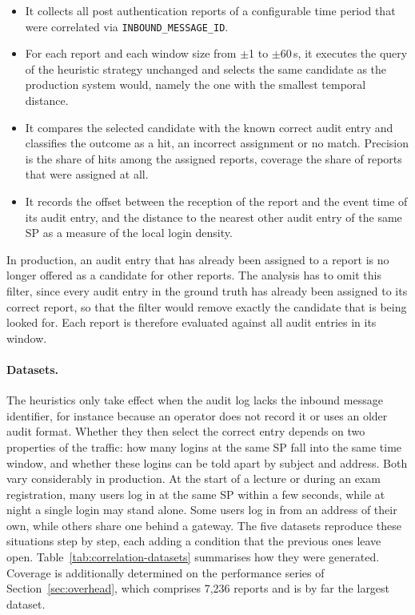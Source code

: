 \documentclass[../main.tex]{subfiles}
\begin{document}
\begin{itemize}
    \item It collects all post authentication reports of a configurable time period that were correlated via \texttt{INBOUND\_\allowbreak{}MESSAGE\_\allowbreak{}ID}.
    \item For each report and each window size from $\pm$1 to $\pm$60\,s, it executes the query of the heuristic strategy unchanged and selects the same candidate as the production system would, namely the one with the smallest temporal distance.
    \item It compares the selected candidate with the known correct audit entry and classifies the outcome as a hit, an incorrect assignment or no match. Precision is the share of hits among the assigned reports, coverage the share of reports that were assigned at all.
    \item It records the offset between the reception of the report and the event time of its audit entry, and the distance to the nearest other audit entry of the same SP as a measure of the local login density.
\end{itemize}

In production, an audit entry that has already been assigned to a report is no longer offered as a 
candidate for other reports. 
The analysis has to omit this filter, since every audit entry in the ground truth has already been 
assigned to its correct report, so that the filter would remove exactly the candidate that is being 
looked for. 
Each report is therefore evaluated against all audit entries in its window.

\paragraph{Datasets.}
The heuristics only take effect when the audit log lacks the inbound message identifier, for 
instance because an operator does not record it or uses an older audit format. 
Whether they then select the correct entry depends on two properties of the traffic: how many 
logins at the same SP fall into the same time window, and whether these logins can be told apart 
by subject and address. 
Both vary considerably in production. 
At the start of a lecture or during an exam registration, many users log in at the same SP within 
a few seconds, while at night a single login may stand alone. 
Some users log in from an address of their own, while others share one behind a gateway. 
The five datasets reproduce these situations step by step, each adding a condition that the 
previous ones leave open. 
Table~\ref{tab:correlation-datasets} summarises how they were generated. 
Coverage is additionally determined on the performance series of Section~\ref{sec:overhead}, 
which comprises 7{,}236 reports and is by far the largest dataset. 
\end{document}
